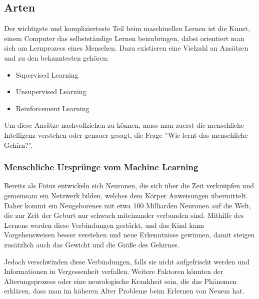 \subsection{Arten}

Der wichtigste und komplizierteste Teil beim maschinellen Lernen ist die Kunst, einem Computer das selbstständige Lernen beizubringen, dabei orientiert man sich am Lernprozess eines Menschen. Dazu existieren eine Vielzahl an Ansätzen und zu den bekanntesten gehören:

\begin{itemize}
      \item Supervised Learning
      \item Unsupervised Learning
      \item Reinforcement Learning
\end{itemize}

Um diese Ansätze nachvollziehen zu können, muss man zuerst die menschliche Intelligenz verstehen oder genauer gesagt, die Frage ''Wie lernt das menschliche Gehirn?''.

\subsubsection{Menschliche Ursprünge vom Machine Learning}

Bereits als Fötus entwickeln sich Neuronen, die sich über die Zeit verknüpfen und gemeinsam ein Netzwerk bilden, welches dem Körper Anweisungen übermittelt. Daher kommt ein Neugeborenes mit etwa 100 Milliarden Neuronen auf die Welt, die zur Zeit der Geburt nur schwach miteinander verbunden sind. Mithilfe des Lernens werden diese Verbindungen gestärkt, und das Kind kann Vorgehensweisen besser verstehen und neue Erkenntnisse gewinnen, damit steigen zusätzlich auch das Gewicht und die Größe des Gehirnes. \cite{LANP}

Jedoch verschwinden diese Verbindungen, falls sie nicht aufgefrischt werden und Informationen in Vergessenheit verfallen. Weitere Faktoren könnten der Alterungsprozess oder eine neurologische Krankheit sein, die das Phänomen erklären, dass man im höheren Alter Probleme beim Erlernen von Neuem hat. \cite{GENTW}

